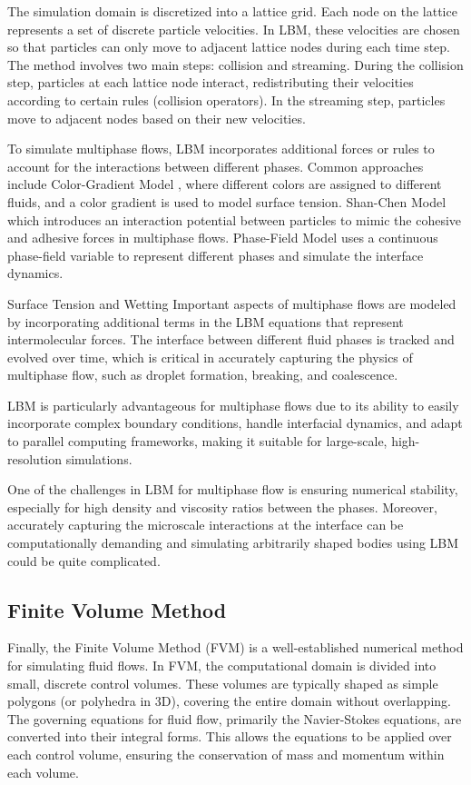 The simulation domain is discretized into a lattice grid. Each node on the lattice represents a set of discrete particle velocities. In LBM, these velocities are chosen so that particles can only move to adjacent lattice nodes during each time step. The method involves two main steps: collision and streaming. During the collision step, particles at each lattice node interact, redistributing their velocities according to certain rules (collision operators). In the streaming step, particles move to adjacent nodes based on their new velocities.

To simulate multiphase flows, LBM incorporates additional forces or rules to account for the interactions between different phases. Common approaches include Color-Gradient Model \cite{ba2013color}, where different colors are assigned to different fluids, and a color gradient is used to model surface tension. Shan-Chen Model \cite{huang2011forcing} which introduces an interaction potential between particles to mimic the cohesive and adhesive forces in multiphase flows. Phase-Field Model \cite{takada2013phase}uses a continuous phase-field variable to represent different phases and simulate the interface dynamics.

Surface Tension and Wetting Important aspects of multiphase flows are modeled by incorporating additional terms in the LBM equations that represent intermolecular forces. The interface between different fluid phases is tracked and evolved over time, which is critical in accurately capturing the physics of multiphase flow, such as droplet formation, breaking, and coalescence.

LBM is particularly advantageous for multiphase flows due to its ability to easily incorporate complex boundary conditions, handle interfacial dynamics, and adapt to parallel computing frameworks, making it suitable for large-scale, high-resolution simulations.

One of the challenges in LBM for multiphase flow is ensuring numerical stability, especially for high density and viscosity ratios between the phases. Moreover, accurately capturing the microscale interactions at the interface can be computationally demanding and simulating arbitrarily shaped bodies using LBM could be quite complicated.

\subsection{Finite Volume Method}

Finally, the Finite Volume Method (FVM) is a well-established numerical method for simulating fluid flows. In FVM, the computational domain is divided into small, discrete control volumes. These volumes are typically shaped as simple polygons (or polyhedra in 3D), covering the entire domain without overlapping. The governing equations for fluid flow, primarily the Navier-Stokes equations, are converted into their integral forms. This allows the equations to be applied over each control volume, ensuring the conservation of mass and momentum within each volume.

